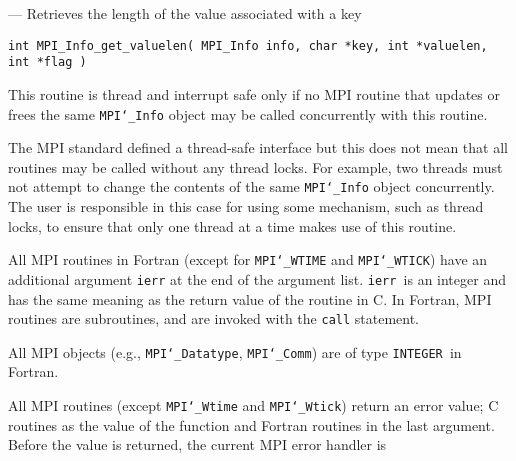 \startmanpage
{}
--- Retrieves the length of the value associated with  a key 
\startvb\begin{verbatim}
int MPI_Info_get_valuelen( MPI_Info info, char *key, int *valuelen, int *flag )

\end{verbatim}
\endvb

\par
{}
\par
\par
{}
\par
This routine is thread and interrupt safe only if no MPI routine that
updates or frees the same {\tt MPI{\tt \char`\_}Info} object may be called concurrently
with this routine.
\par
The MPI standard defined a thread-safe interface but this does not
mean that all routines may be called without any thread locks.  For
example, two threads must not attempt to change the contents of the
same {\tt MPI{\tt \char`\_}Info} object concurrently.  The user is responsible in this
case for using some mechanism, such as thread locks, to ensure that
only one thread at a time makes use of this routine.
\par
{}
All MPI routines in Fortran (except for {\tt MPI{\tt \char`\_}WTIME} and {\tt MPI{\tt \char`\_}WTICK}) have
an additional argument {\tt ierr} at the end of the argument list.  {\tt ierr
}is an integer and has the same meaning as the return value of the routine
in C.  In Fortran, MPI routines are subroutines, and are invoked with the
{\tt call} statement.
\par
All MPI objects (e.g., {\tt MPI{\tt \char`\_}Datatype}, {\tt MPI{\tt \char`\_}Comm}) are of type {\tt INTEGER
}in Fortran.
\par
{}
\par
All MPI routines (except {\tt MPI{\tt \char`\_}Wtime} and {\tt MPI{\tt \char`\_}Wtick}) return an error value;
C routines as the value of the function and Fortran routines in the last
argument.  Before the value is returned, the current MPI error handler is
